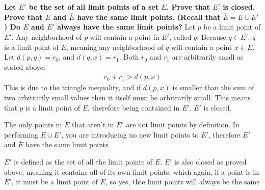 \documentclass{article}
\begin{document}
\section{} 
\noindent \textbf{Let $E'$ be the set of all limit points of a set $E$. Prove that $E'$ is closed. Prove that $E$ and $\bar{E}$ have the same limit points. (Recall that $\bar{E} = E \cup E'$) Do $E$ and $E'$ always have the same limit points? }
Let $p$ be a limit point of $E'$. Any neighborhood of $p$ will contain a point in $E'$, called $q$. Because $q \in E'$, $q$ is a limit point of $E$, meaning any neighborhood of $q$ will contain
a point $x \in E$. Let $d(p,q) = r_0$, and $d(q,x) = r_1$. Both $r_0$ and $r_1$ are arbitrarily small as stated above.
\begin{align*}
    r_0 + r_1 > d(p,x)
\end{align*}
This is due to the triangle inequality, and if $d(p,x)$ is smaller than the sum of two arbitrarily small values then it itself must be arbitrarily small. This means that $p$ is a limit point of $E$, therefore being contained in $E'$. $E'$ is closed.

\vspace{10 pt}

\noindent The only points in $E$ that aren't in $E'$ are not limit points by definition. In performing $E \cup E'$, you are introducing no new limit points to $E'$, therefore $E'$ and $\bar{E}$ have the same limit points

\vspace{10 pt}
\noindent $E'$ is defined as the set of all the limit points of $E$. $E'$ is also closed as proved above, meaning it contains all of its own limit points, which again, if a point is in $E'$, it must be a limit point of $E$, so yes, thte limit points will always be the same
\end{document}
